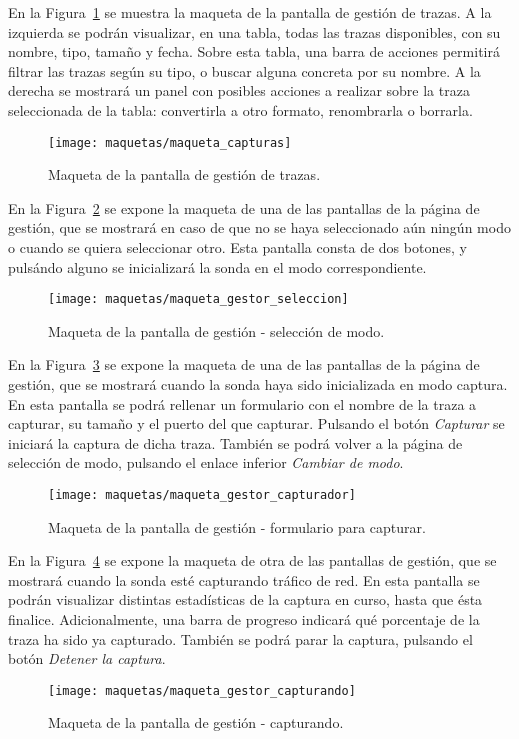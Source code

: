 En la Figura~\ref{fig:maqueta:capturas} se muestra la maqueta de la pantalla de gestión de \glspl{traza}.
A la izquierda se podrán visualizar, en una tabla, todas las \glspl{traza} disponibles, con su nombre, tipo, tamaño y fecha.
Sobre esta tabla, una barra de acciones permitirá filtrar las \glspl{traza} según su tipo, o buscar alguna concreta por su nombre.
A la derecha se mostrará un panel con posibles acciones a realizar sobre la \gls{traza} seleccionada de la tabla: convertirla a otro formato, renombrarla o borrarla.
\begin{figure}[!htp]
  \centering
  \texttt{[image: maquetas/maqueta\_capturas]}
  \caption{Maqueta de la pantalla de gestión de \glspl{traza}.}
  \label{fig:maqueta:capturas}
\end{figure}
\clearpage

En la Figura~\ref{fig:maqueta:gestor_seleccion} se expone la maqueta de una de las pantallas de la página de gestión, que se mostrará en caso de que no se haya seleccionado aún ningún modo o cuando se quiera seleccionar otro.
Esta pantalla consta de dos botones, y pulsándo alguno se inicializará la sonda en el modo correspondiente.
\begin{figure}[!htp]
  \centering
  \texttt{[image: maquetas/maqueta\_gestor\_seleccion]}
  \caption{Maqueta de la pantalla de gestión - selección de modo.}
  \label{fig:maqueta:gestor_seleccion}
\end{figure}
\clearpage

En la Figura~\ref{fig:maqueta:gestor_capturador} se expone la maqueta de una de las pantallas de la página de gestión, que se mostrará cuando la sonda haya sido inicializada en modo captura.
En esta pantalla se podrá rellenar un formulario con el nombre de la \gls{traza} a capturar, su tamaño y el puerto del que capturar.
Pulsando el botón \textit{Capturar} se iniciará la captura de dicha \gls{traza}.
También se podrá volver a la página de selección de modo, pulsando el enlace inferior \textit{Cambiar de modo}.
\begin{figure}[!htp]
  \centering
  \texttt{[image: maquetas/maqueta\_gestor\_capturador]}
  \caption{Maqueta de la pantalla de gestión - formulario para capturar.}
  \label{fig:maqueta:gestor_capturador}
\end{figure}
\clearpage

En la Figura~\ref{fig:maqueta:gestor_capturando} se expone la maqueta de otra de las pantallas de gestión, que se mostrará cuando la sonda esté capturando tráfico de red.
En esta pantalla se podrán visualizar distintas estadísticas de la captura en curso, hasta que ésta finalice.
Adicionalmente, una barra de progreso indicará qué porcentaje de la \gls{traza} ha sido ya capturado.
También se podrá parar la captura, pulsando el botón \textit{Detener la captura}.
\begin{figure}[!htp]
  \centering
  \texttt{[image: maquetas/maqueta\_gestor\_capturando]}
  \caption{Maqueta de la pantalla de gestión - capturando.}
  \label{fig:maqueta:gestor_capturando}
\end{figure}
\clearpage

